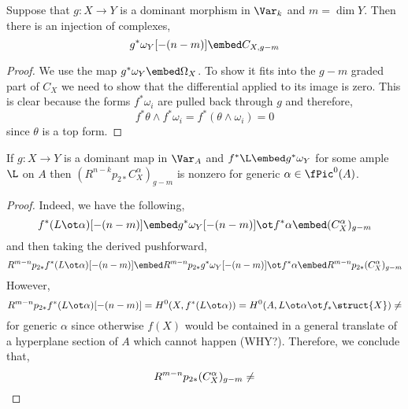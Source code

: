 \documentclass[12pt]{article}
\begin{document}
\begin{lemma}
Suppose that $g : X \to Y$ is a dominant morphism in $\Var_k$ and $m = \dim{Y}$. Then there is an injection of complexes,
\[ g^* \omega_Y[-(n-m)] \embed C_{X,g-m} \]
\end{lemma}

\begin{proof}
We use the map $g^* \omega_Y \embed \Omega_{X}$. To show it fits into the $g-m$ graded part of $C_X$ we need to show that the differential applied to its image is zero. This is clear because the forms $f^* \omega_i$ are pulled back through $g$ and therefore,
\[ f^* \theta \wedge f^* \omega_i = f^* (\theta \wedge \omega_i) = 0 \]
since $\theta$ is a top form. 
\end{proof}

\begin{prop}
If $g : X \to Y$ is a dominant map in $\Var_A$ and $f^* \L \embed g^* \omega_Y$ for some ample $\L$ on $A$ then $(R^{n-k} p_{2*} C_{X}^\alpha)_{g-m}$ is nonzero for generic $\alpha \in \fPic^0(A)$.
\end{prop}

\begin{proof}
Indeed, we have the following,
\[ f^* (L \ot \alpha)[-(n-m)] \embed g^* \omega_Y [-(n-m)] \ot f^* \alpha \embed (C_X^\alpha)_{g-m} \]
and then taking the derived pushforward,
\[ R^{m-n} p_{2*} f^* (L \ot \alpha)[-(n-m)] \embed R^{m-n} p_{2*} g^* \omega_Y [-(n-m)] \ot f^* \alpha \embed R^{m-n} p_{2*} (C_X^\alpha)_{g-m} \]
However, 
\[  R^{m-n} p_{2*} f^* (L \ot \alpha)[-(n-m)] = H^0(X, f^* (L \ot \alpha)) = H^0(A, L \ot \alpha \ot f_* \struct{X}) \neq \empty \]
for generic $\alpha$ since otherwise $f(X)$ would be contained in a general translate of a hyperplane section of $A$ which cannot happen (WHY?). Therefore, we conclude that,
\[ R^{m-n} p_{2*} (C_X^\alpha)_{g-m} \neq \empty \]
\end{proof}
\end{document}
